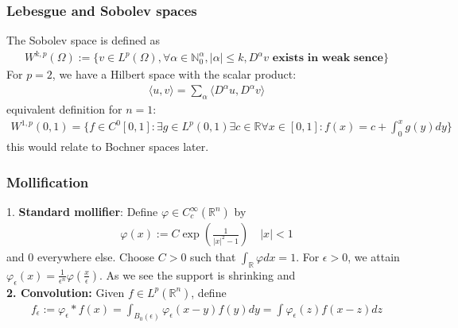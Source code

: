 \subsubsection*{Lebesgue and Sobolev spaces}
\begin{definition}
	The Sobolev space is defined as 
	\begin{align*}
		W^{k, p}(\Omega) := \{ v \in L^p(\Omega), \forall \alpha \in \mathbb{N}_0^\alpha, |\alpha| \le k, D^\alpha v \textbf{ exists in weak sence}\}
	\end{align*}
	For $p = 2$, we have a Hilbert space with the scalar product:
	\begin{align*}
		\langle u, v \rangle = \sum_{\alpha} \langle D^\alpha u, D^\alpha v \rangle
	\end{align*}
	equivalent definition for $n = 1$: 
	\begin{align*}
		W^{1, p}(0, 1) = \{ f \in C^0[0, 1]: \exists g \in L^p(0, 1) \exists c \in \mathbb{R} \forall x \in [0, 1]: f(x) = c + \int_0^x g(y)dy \}
	\end{align*}
	this would relate to Bochner spaces later. 
\end{definition}

\subsubsection*{Mollification}
1. \textbf{Standard mollifier}: Define $\varphi \in C_c^\infty(\mathbb{R}^n)$ by 
\begin{align*}
	\varphi(x) := C\exp(\frac{1}{|x|^2 - 1}) \quad |x| < 1
\end{align*}
and 0 everywhere else. Choose $C>0$ such that $\int_\mathbb{R} \varphi dx = 1$. For $\epsilon >0$, we attain $\varphi_\epsilon(x) = \frac{1}{\epsilon^n} \varphi (\frac{x}{\epsilon})$. As we see the support is shrinking and \\
\textbf{2. Convolution:} Given $f \in L^p(\mathbb{R}^n)$, define 
\begin{align*}
	f_\epsilon := \varphi_\epsilon * f(x) = \int_{B_0(\epsilon)} \varphi_\epsilon (x - y) f(y) dy = \int \varphi_\epsilon(z)f(x - z)dz
\end{align*} 





